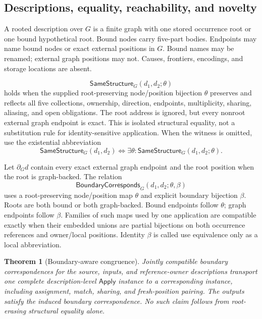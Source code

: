 \documentclass[11pt,twoside]{article}
\newcommand{\Apply}{\mathsf{Apply}}
\newcommand{\SameStructure}{\mathsf{SameStructure}}
\newcommand{\BoundaryCorresponds}{\mathsf{BoundaryCorresponds}}
\newtheorem{theorem}{Theorem}
\begin{document}
\subsection{Descriptions, equality, reachability, and novelty}

A rooted description over \(G\) is a finite graph with one stored occurrence root
or one bound hypothetical root.  Bound nodes carry five-part bodies.  Endpoints may
name bound nodes or exact external positions in \(G\).  Bound names may be renamed;
external graph positions may not.  Causes, frontiers, encodings, and storage
locations are absent.

\[
  \SameStructure_G(d_1,d_2;\theta)
\]
holds when the supplied root-preserving node/position bijection \(\theta\)
preserves and reflects all five collections, ownership, direction, endpoints,
multiplicity, sharing, aliasing, and open obligations.  The root address is ignored,
but every nonroot external graph endpoint is exact.  This is isolated structural
equality, not a substitution rule for identity-sensitive application.
When the witness is omitted, use the existential abbreviation
\[
 \SameStructure_G(d_1,d_2)
 \Longleftrightarrow
 \exists\theta:\SameStructure_G(d_1,d_2;\theta).
\]

Let \(\partial_G d\) contain every exact external graph endpoint and the root
position when the root is graph-backed.  The relation
\[
  \BoundaryCorresponds_G(d_1,d_2;\theta,\beta)
\]
uses a root-preserving node/position map \(\theta\) and explicit boundary bijection
\(\beta\).  Roots are both bound or both graph-backed.  Bound endpoints follow
\(\theta\); graph endpoints follow \(\beta\).  Families of such maps used by one
application are compatible exactly when their embedded unions are partial
bijections on both occurrence references and owner/local positions.  Identity
\(\beta\) is called use equivalence only as a local abbreviation.

\begin{theorem}[Boundary-aware congruence]\label{thm:congruence}
Jointly compatible boundary correspondences for the source, inputs, and
reference-owner descriptions transport one complete description-level
\(\Apply\) instance to a corresponding instance, including assignment, match,
sharing, and fresh-position pairing.  The outputs satisfy the induced boundary
correspondence.  No such claim follows from root-erasing structural equality
alone.
\end{theorem}
\end{document}
